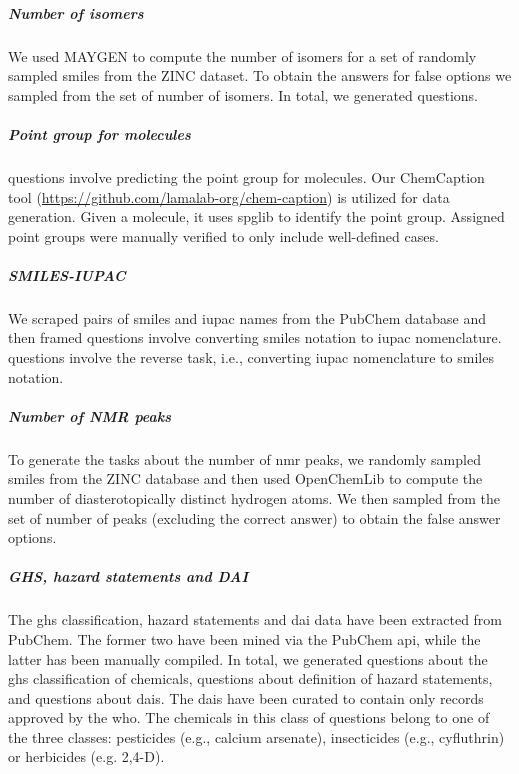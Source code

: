 \documentclass[11pt, oneside]{article}
\begin{document}
\begin{refsection}
\subparagraph{Number of isomers}
We used MAYGEN\autocite{Yirik_2021} to compute the number of isomers for a set of randomly sampled \gls{smiles} from the ZINC dataset.\autocite{Irwin_2012}
To obtain the answers for false options we sampled from the set of number of isomers. In total, we generated  questions.

\subparagraph{Point group for molecules}
 questions involve predicting the point group for molecules. Our ChemCaption tool (\url{https://github.com/lamalab-org/chem-caption}) is utilized for data generation. 
Given a molecule, it uses spglib\autocite{spglib} to identify the point group. 
Assigned point groups were manually verified to only include well-defined cases.

\subparagraph{SMILES-IUPAC}
We scraped pairs of \gls{smiles} and \gls{iupac} names from the PubChem database \autocite{pubchem} and then framed  questions involve converting \gls{smiles} notation to \gls{iupac} nomenclature.
 questions involve the reverse task, i.e., converting \gls{iupac} nomenclature to \gls{smiles} notation.


\subparagraph{Number of NMR peaks} 
To generate the   tasks about the number of \gls{nmr} peaks, we randomly sampled \gls{smiles} from the ZINC database\autocite{Irwin_2012} and then used OpenChemLib\autocite{openchemlib} to compute the number of diasterotopically distinct hydrogen atoms. 
We then sampled from the set of number of peaks (excluding the correct answer) to obtain the false answer options.

\subparagraph{GHS, hazard statements and DAI}
The \gls{ghs} classification, hazard statements and \gls{dai} data have been extracted from PubChem.\autocite{pubchem}
The former two have been mined via the PubChem \gls{api}, while the latter has been manually compiled. 
In total, we generated  questions about the \gls{ghs} classification of chemicals,  questions about definition of hazard statements, and  questions about \glspl{dai}.
The \glspl{dai} have been curated to contain only records approved by the \gls{who}.
The chemicals in this class of questions belong to one of the three classes: pesticides (e.g., calcium arsenate), insecticides (e.g., cyfluthrin) or herbicides (e.g. 2,4-D).



\end{refsection}
\end{document}
